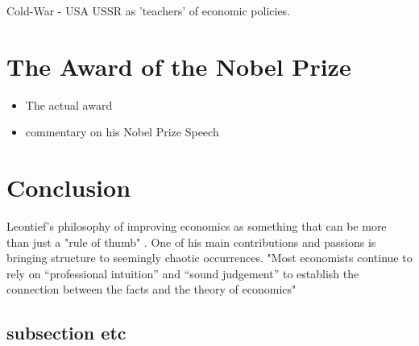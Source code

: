 \documentclass[12pt,a4paper]{scrartcl}
\begin{document}
	Cold-War - USA USSR as 'teachers' of economic policies.\newline
	
	\section{The Award of the Nobel Prize} \label{nobelprize}
	
		\begin{itemize}
		\item The actual award
		\item commentary on his Nobel Prize Speech
	\end{itemize}

	\section{Conclusion}
	
	
	Leontief's philosophy of improving economics as something that can be more than just a "rule of thumb" \cite[p.~36]{leontief1960niedergang}.
	One of his main contributions and passions is bringing structure to seemingly chaotic occurrences. 	"Most economists continue to rely on “professional intuition” and “sound judgement” to establish the connection between the facts and the theory of economics" \cite[p.~13]{leontief1951input}
	





	
	
	
	\subsection{subsection etc}
	
	
	\cite{Samuelson2007}
	
	\listoftodos

	
	
\end{document}
